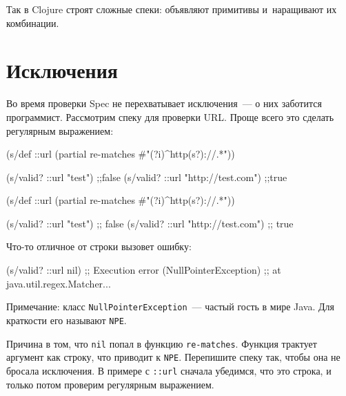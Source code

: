 Так в Clojure строят сложные спеки: объявляют примитивы и~наращивают их
комбинации.

\section{Исключения}


Во время проверки Spec не перехватывает исключения~--- о них заботится
программист. Рассмотрим спеку для проверки URL. Проще всего это сделать
регулярным выражением:


\ifx\DEVICETYPE\MOBILE

\begin{english}
  \begin{clojure}
(s/def ::url
  (partial
    re-matches #"(?i)^http(s?)://.*"))

(s/valid? ::url "test") ;;false
(s/valid? ::url "http://test.com") ;;true
  \end{clojure}
\end{english}

\else

\begin{english}
  \begin{clojure}
(s/def ::url
  (partial re-matches #"(?i)^http(s?)://.*"))

(s/valid? ::url "test")            ;; false
(s/valid? ::url "http://test.com") ;; true
  \end{clojure}
\end{english}

\fi

Что-то отличное от строки вызовет ошибку:


\begin{english}
  \begin{clojure}
(s/valid? ::url nil)
;; Execution error (NullPointerException)
;; at java.util.regex.Matcher...
  \end{clojure}
\end{english}


Примечание: класс \verb|NullPointerException|~--- частый гость в мире Java. Для
краткости его называют \verb|NPE|.

Причина в том, что \verb|nil| попал в функцию \verb|re-matches|. Функция
трактует аргумент как строку, что приводит к \verb|NPE|. Перепишите спеку так,
чтобы она не бросала исключения. В примере с \verb|::url| сначала убедимся,
что это строка, и только потом проверим регулярным выражением.

